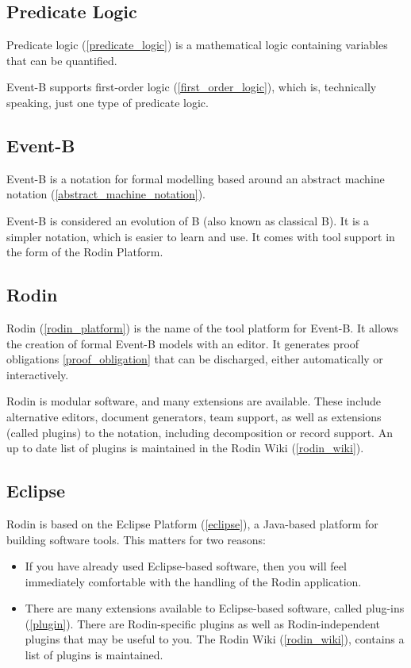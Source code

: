 \subsection{Predicate Logic}

Predicate logic (\ref{predicate_logic}) is a mathematical logic containing variables that can be quantified.

Event-B supports first-order logic (\ref{first_order_logic}), which is, technically speaking, just one type of predicate logic.  

\subsection{Event-B}

Event-B is a notation for formal modelling based around an abstract machine notation (\ref{abstract_machine_notation}).

Event-B is considered an evolution of B (also known as classical B). It is a simpler notation, which is easier to learn and use. It comes with tool support in the form of the Rodin Platform.

\subsection{Rodin}

Rodin (\ref{rodin_platform}) is the name of the tool platform for Event-B.  It allows the creation of formal Event-B models with an editor.  It generates proof obligations \ref{proof_obligation} that can be discharged, either automatically or interactively.

Rodin is modular software, and many extensions are available.  These include alternative editors, document generators, team support, as well as extensions (called plugins) to the notation, including decomposition or record support.  An up to date list of plugins is maintained in the Rodin Wiki (\ref{rodin_wiki}).

\subsection{Eclipse}

Rodin is based on the Eclipse Platform (\ref{eclipse}), a Java-based platform for building software tools.  This matters for two reasons:
\begin{itemize}
	\item If you have already used Eclipse-based software, then you will feel immediately comfortable with the handling of the Rodin application.
	\item There are many extensions available to Eclipse-based software, called plug-ins (\ref{plugin}).  There are Rodin-specific plugins as well as Rodin-independent plugins that may be useful to you.  The Rodin Wiki (\ref{rodin_wiki}), contains a list of plugins is maintained.
\end{itemize}

